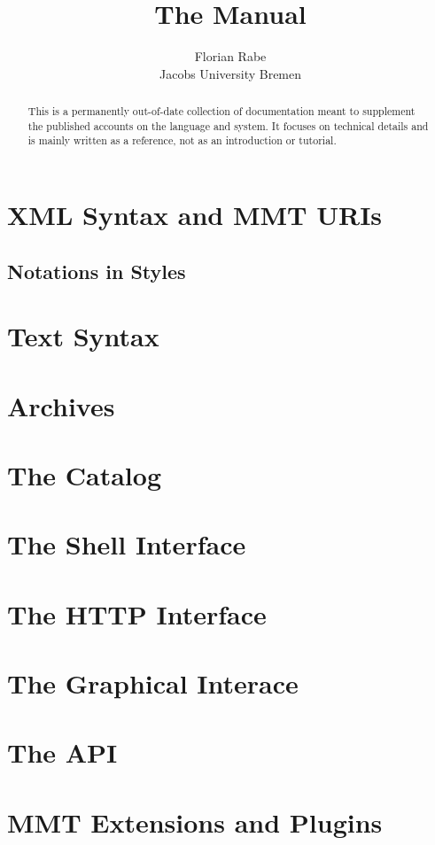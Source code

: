 \documentclass{article}
\title{The {\mmt} Manual}
\author{Florian Rabe \\
Jacobs University Bremen}
\begin{document}
\maketitle

\begin{abstract}
This is a permanently out-of-date collection of documentation meant to supplement the published accounts on the \mmt language and system.
It focuses on technical details and is mainly written as a reference, not as an introduction or tutorial.
\end{abstract}

\section{XML Syntax and MMT URIs}\label{sec:syntax}
  

\subsection{Notations in Styles}\label{sec:notations}
  

\section{Text Syntax}\label{sec:syntax}
  

\section{Archives}\label{sec:archives}
  

\section{The Catalog}\label{sec:catalog}
  

\section{The Shell Interface}\label{sec:shell}
  

\section{The HTTP Interface}\label{sec:http}
  

\section{The Graphical Interace}\label{sec:gui}
  

\section{The API}
  

\section{MMT Extensions and Plugins}\label{sec:extensions}
  




\end{document}
